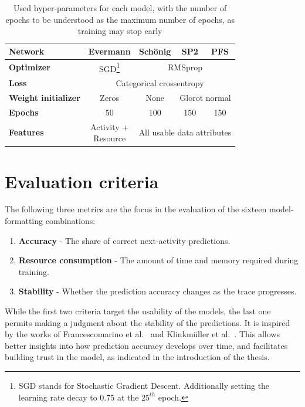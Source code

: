 \begin{table}[ht!]
    \centering
    \begin{tabular}{lcccc}
        \textbf{Network}   & \textbf{Evermann} & \textbf{Schönig} & \textbf{SP2} & \textbf{PFS}\\
        \hline
        \textbf{Optimizer} & SGD\footnote{SGD stands for Stochastic Gradient Descent. Additionally setting the learning rate decay to $0.75$ at the $25^{th}$ epoch.} & \multicolumn{3}{c}{RMSprop} \\
        \textbf{Loss}      &\multicolumn{4}{c}{Categorical crossentropy}\\
        \textbf{Weight initializer} & Zeros & None & \multicolumn{2}{c}{Glorot normal}\\
        \textbf{Epochs}    & 50 & 100 & 150 & 150\\
        \textbf{Features}  & \makecell{Activity +\\Resource} & \multicolumn{3}{c}{All usable data attributes}\\
    \end{tabular}
    \caption{Used hyper-parameters for each model, with the number of epochs to be understood as the maximum number of epochs, as training may stop early}
    \label{tab:training-setup}
\end{table}

\section{Evaluation criteria}
\label{sec:eval:criteria}
The following three metrics are the focus in the evaluation of the sixteen model-formatting combinations:

\begin{enumerate}
    \item\textbf{Accuracy} - The share of correct next-activity predictions.
    \item\textbf{Resource consumption} - The amount of time and memory required during training.
    \item\textbf{Stability} - Whether the prediction accuracy changes as the trace progresses.
\end{enumerate}

While the first two criteria target the usability of the models, the last one permits making a judgment about the stability of the predictions. It is inspired by the works of Francescomarino et al.~\cite{francescomarino2015} and Klinkmüller et al.~\cite{klinkmuller2018reliablemonitoring}. This allows better insights into how prediction accuracy develops over time, and facilitates building trust in the model, as indicated in the introduction of the thesis.

